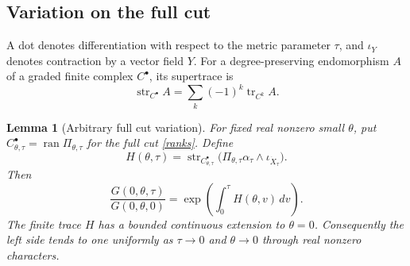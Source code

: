 \documentclass[11pt,letterpaper,reqno]{amsart}
\newtheorem{lemma}[theorem]{Lemma}
\theoremstyle{remark}
\newcommand{\tr}{\operatorname{tr}}
\newcommand{\str}{\operatorname{str}}
\begin{document}
\subsection{Variation on the full cut}
A dot denotes differentiation with respect to the metric parameter
$\tau$, and $\iota_Y$ denotes contraction by a vector field $Y$.
For a degree-preserving endomorphism $A$ of a graded finite complex
$C^\bullet$, its supertrace is
\[
 \str_{C^\bullet}A=\sum_k(-1)^k\tr_{C^k}A.
\]
\begin{lemma}[Arbitrary full cut variation]\label{cutvariation}
For fixed real nonzero small $\theta$, put
$C^\bullet_{\theta,\tau}=\operatorname{ran}\Pi_{\theta,\tau}$ for
the full cut \eqref{ranks}. Define
\[
 H(\theta,\tau)=
     \str_{C^\bullet_{\theta,\tau}}
       \bigl(\Pi_{\theta,\tau}\alpha_\tau\wedge
                                  \iota_{\dot X_\tau}\bigr).
\]
Then
\begin{equation}\label{Gvariation}
 \frac{G(0,\theta,\tau)}{G(0,\theta,0)}
       =\exp\left(\int_0^\tau H(\theta,v)\,dv\right).
\end{equation}
The finite trace $H$ has a bounded continuous extension to $\theta=0$.
Consequently the left side tends to one uniformly as $\tau\to0$
and $\theta\to0$ through real nonzero characters.
\end{lemma}
\end{document}
